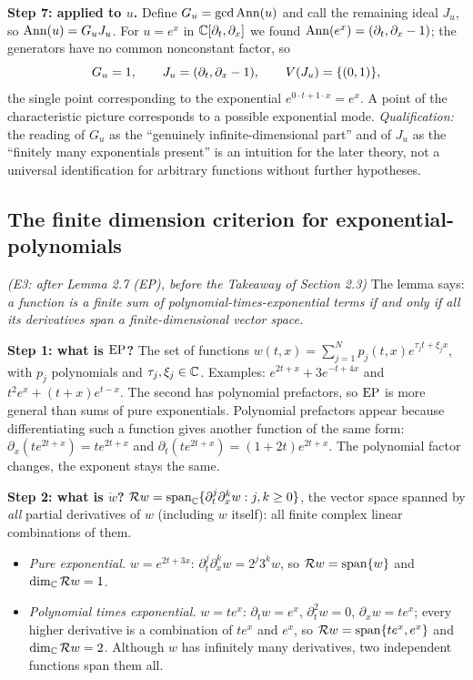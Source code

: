 \medskip\textbf{Step 7: applied to $u$.} Define $G_u=\operatorname{gcd}\operatorname{Ann}(u)$ and call the remaining ideal $J_u$, so $\operatorname{Ann}(u)=G_uJ_u$. For $u=e^x$ in $\mathbb{C}[\partial_t,\partial_x]$ we found $\operatorname{Ann}(e^x)=(\partial_t,\partial_x-1)$; the generators have no common nonconstant factor, so
\[
G_u=1,\qquad J_u=(\partial_t,\partial_x-1),\qquad V(J_u)=\{(0,1)\},
\]
the single point corresponding to the exponential $e^{0\cdot t+1\cdot x}=e^x$. A point of the characteristic picture corresponds to a possible exponential mode. \emph{Qualification:} the reading of $G_u$ as the ``genuinely infinite-dimensional part'' and of $J_u$ as the ``finitely many exponentials present'' is an intuition for the later theory, not a universal identification for arbitrary functions without further hypotheses.

\subsection{The finite dimension criterion for exponential-polynomials}\label{expl:E3}
\noindent\emph{(E3: after Lemma 2.7 (EP), before the Takeaway of Section 2.3)}
The lemma says: \emph{a function is a finite sum of polynomial-times-exponential terms if and only if all its derivatives span a finite-dimensional vector space.}

\medskip\textbf{Step 1: what is $\mathrm{EP}$?} The set of functions $w(t,x)=\sum_{j=1}^Np_j(t,x)e^{\tau_jt+\xi_jx}$, with $p_j$ polynomials and $\tau_j,\xi_j\in\mathbb{C}$. Examples: $e^{2t+x}+3e^{-t+4x}$ and $t^2e^x+(t+x)e^{t-x}$. The second has polynomial prefactors, so $\mathrm{EP}$ is more general than sums of pure exponentials. Polynomial prefactors appear because differentiating such a function gives another function of the same form: $\partial_x(te^{2t+x})=te^{2t+x}$ and $\partial_t(te^{2t+x})=(1+2t)e^{2t+x}$. The polynomial factor changes, the exponent stays the same.

\medskip\textbf{Step 2: what is $\ring w$?} $\mathcal{R} w=\operatorname{span}_{\mathbb{C}}\{\partial_t^j\partial_x^kw:j,k\ge0\}$, the vector space spanned by \emph{all} partial derivatives of $w$ (including $w$ itself): all finite complex linear combinations of them.
\begin{itemize}[nosep]
\item \emph{Pure exponential.} $w=e^{2t+3x}$: $\partial_t^j\partial_x^kw=2^j3^kw$, so $\mathcal{R} w=\operatorname{span}\{w\}$ and $\dim_{\mathbb{C}}\mathcal{R} w=1$.
\item \emph{Polynomial times exponential.} $w=te^x$: $\partial_tw=e^x$, $\partial_t^2w=0$, $\partial_xw=te^x$; every higher derivative is a combination of $te^x$ and $e^x$, so $\mathcal{R} w=\operatorname{span}\{te^x,e^x\}$ and $\dim_{\mathbb{C}}\mathcal{R} w=2$. Although $w$ has infinitely many derivatives, two independent functions span them all.
\end{itemize}

